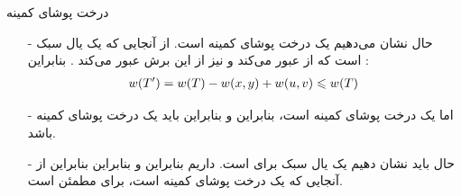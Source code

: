 \begin{frame}{‌درخت پوشای کمینه}
\begin{itemize}\itemr
\item[-]
حال نشان می‌دهیم
یک درخت پوشای کمینه است. از آنجایی که
یک یال سبک است که از
عبور می‌کند و
نیز از این برش عبور می‌کند
. بنابراین :
\begin{align*}
\mathnormal{w(T') = w(T) - w(x,y) + w(u,v) \leqslant w(T)}
\end{align*}
\item[-]
اما
یک درخت پوشای کمینه است، بنابراین
و بنابراین
باید یک درخت پوشای کمینه باشد.
\item[-]
حال باید نشان دهیم
یک یال سبک برای
است. داریم
بنابراین
و
بنابراین
بنابراین از آنجایی که
یک درخت پوشای کمینه است،
برای
مطمئن است.
\end{itemize}
\end{frame}
\fi
